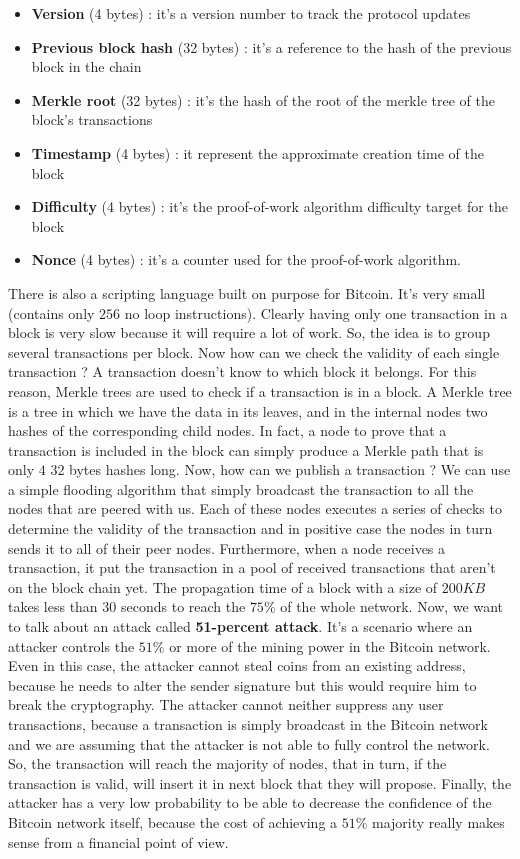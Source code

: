 \begin{itemize}
\item \textbf{Version} (4 bytes) : it's a version number to track the protocol updates
\item \textbf{Previous block hash} (32 bytes) : it's a reference to the hash of the previous block in the chain
\item \textbf{Merkle root} (32 bytes) : it's the hash of the root of the merkle tree of the block's transactions
\item \textbf{Timestamp} (4 bytes) : it represent the approximate creation time of the block
\item \textbf{Difficulty} (4 bytes) : it's the proof-of-work algorithm difficulty target for the block
\item \textbf{Nonce} (4 bytes) : it's a counter used for the proof-of-work algorithm.
\end{itemize}
There is also a scripting language built on purpose for Bitcoin. It's very small (contains only $256$ no loop instructions). Clearly having only one transaction in a block is very slow because it will require a lot of work. So, the idea is to group several transactions per block. Now how can we check the validity of each single transaction ? A transaction doesn't know to which block it belongs. For this reason, Merkle trees are used to check if a transaction is in a block. A Merkle tree is a tree in which we have the data in its leaves, and in the internal nodes two hashes of the corresponding child nodes. In fact, a node to prove that a transaction is included in the block can simply produce a Merkle path that is only $4$ $32$ bytes hashes long. Now, how can we publish a transaction ? We can use a simple flooding algorithm that simply broadcast the transaction to all the nodes that are peered with us. Each of these nodes executes a series of checks to determine the validity of the transaction and in positive case the nodes in turn sends it to all of their peer nodes. Furthermore, when a node receives a transaction, it put the transaction in a pool of received transactions that aren't on the block chain yet. The propagation time of a block with a size of $200KB$ takes less than $30$ seconds to reach the $75 \%$ of the whole network. Now, we want to talk about an attack called \textbf{51-percent attack}. It's a scenario where an attacker controls the $51 \%$ or more of the mining power in the Bitcoin network. Even in this case, the attacker cannot steal coins from an existing address, because he needs to alter the sender signature but this would require him to break the cryptography. The attacker cannot neither suppress any user transactions, because a transaction is simply broadcast in the Bitcoin network and we are assuming that the attacker is not able to fully control the network. So, the transaction will reach the majority of nodes, that in turn, if the transaction is valid, will insert it in next block that they will propose. Finally, the attacker has a very low probability to be able to decrease the confidence of the Bitcoin network itself, because the cost of achieving a $51 \%$ majority really makes sense from a financial point of view.

